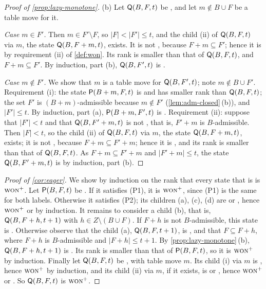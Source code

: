 \begin{proof}[Proof of \cref{prop:lazy-monotone}]
(b) Let $\mathsf{Q}(B,F,t)$ be \WON, and let $m\notin B\cup F$ be a table move for it.

\emph{Case $m\in F'$.} Then $m\in F'\setminus F$, so $|F|<|F'|\le t$, and the child \textup{(ii)} of
$\mathsf{Q}(B,F,t)$ via $m$, the state $\mathsf{Q}(B,F+m,t)$, exists. It is not \VOID, because $F+m\subseteq F'$; hence
it is \WON{} by requirement (ii) of \cref{def:won}. Its rank is smaller than that of $\mathsf{Q}(B,F,t)$,
and $F+m\subseteq F'$. By induction, part (b), $\mathsf{Q}(B,F',t)$ is \WON.

\emph{Case $m\notin F'$.} We show that $m$ is a table move for $\mathsf{Q}(B,F',t)$; note $m\notin B\cup F'$.
Requirement (i): the state $\mathsf{P}(B+m,F,t)$ is \WON{} and has smaller rank than $\mathsf{Q}(B,F,t)$; the set $F'$ is
$(B+m)$-admissible because $m\notin F'$ (\cref{lem:adm-closed}\,(b)), and $|F'|\le t$. By induction, part
(a), $\mathsf{P}(B+m,F',t)$ is \WON. Requirement (ii): suppose that $|F'|<t$ and that $\mathsf{Q}(B,F'+m,t)$ is not
\VOID, that is, $F'+m$ is $B$-admissible. Then $|F|<t$, so the child \textup{(ii)} of $\mathsf{Q}(B,F,t)$ via $m$,
the state $\mathsf{Q}(B,F+m,t)$, exists; it is not \VOID, because $F+m\subseteq F'+m$; hence it is \WON, and its
rank is smaller than that of $\mathsf{Q}(B,F,t)$. As $F+m\subseteq F'+m$ and $|F'+m|\le t$, the state
$\mathsf{Q}(B,F'+m,t)$ is \WON{} by induction, part (b).
\end{proof}

\begin{proof}[Proof of \cref{cor:eager}]
We show by induction on the rank that every state that is \WON{} is $\textup{\textsc{won}}^{+}$. Let $\mathsf{P}(B,F,t)$ be \WON. If
it satisfies (P1), it is $\textup{\textsc{won}}^{+}$, since (P1) is the same for both labels. Otherwise it satisfies (P2); its
children \textup{(a)}, \textup{(c)}, \textup{(d)} are \WON{} or \VOID, hence $\textup{\textsc{won}}^{+}$ or \VOID{} by induction.
It remains to consider a child \textup{(b)}, that is, $\mathsf{Q}(B,F+h,t+1)$ with $h\in Z\setminus(B\cup F)$. If
$F+h$ is not $B$-admissible, this state is \VOID. Otherwise observe that the child \textup{(a)},
$\mathsf{Q}(B,F,t+1)$, is \WON, and that $F\subseteq F+h$, where $F+h$ is $B$-admissible and $|F+h|\le t+1$. By
\cref{prop:lazy-monotone}\,(b), $\mathsf{Q}(B,F+h,t+1)$ is \WON. Its rank is smaller than that of
$\mathsf{P}(B,F,t)$, so it is $\textup{\textsc{won}}^{+}$ by induction. Finally let $\mathsf{Q}(B,F,t)$ be \WON, with table move $m$. Its
child \textup{(i)} via $m$ is \WON, hence $\textup{\textsc{won}}^{+}$ by induction, and its child \textup{(ii)} via $m$, if it
exists, is \WON{} or \VOID, hence $\textup{\textsc{won}}^{+}$ or \VOID. So $\mathsf{Q}(B,F,t)$ is $\textup{\textsc{won}}^{+}$.
\end{proof}

